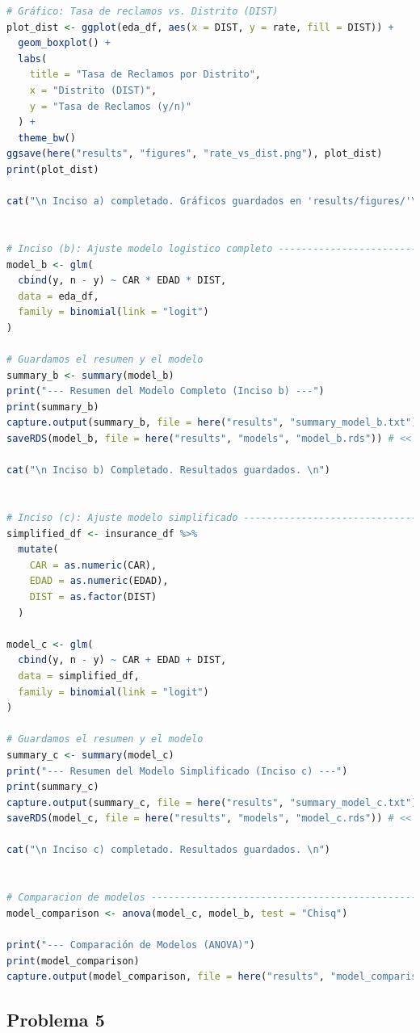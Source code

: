 \begin{lstlisting}[language=R, caption={Script: Reclamo polizas de seguros.}, label={lst:script8}]
# Gráfico: Tasa de reclamos vs. Distrito (DIST)
plot_dist <- ggplot(eda_df, aes(x = DIST, y = rate, fill = DIST)) +
  geom_boxplot() +
  labs(
    title = "Tasa de Reclamos por Distrito",
    x = "Distrito (DIST)",
    y = "Tasa de Reclamos (y/n)"
  ) +
  theme_bw()
ggsave(here("results", "figures", "rate_vs_dist.png"), plot_dist) 
print(plot_dist)

cat("\n Inciso a) completado. Gráficos guardados en 'results/figures/'\n")


# Inciso (b): Ajuste modelo logistico completo --------------------------------
model_b <- glm(
  cbind(y, n - y) ~ CAR * EDAD * DIST,
  data = eda_df,
  family = binomial(link = "logit")
)

# Guardamos el resumen y el modelo
summary_b <- summary(model_b)
print("--- Resumen del Modelo Completo (Inciso b) ---")
print(summary_b)
capture.output(summary_b, file = here("results", "summary_model_b.txt"))
saveRDS(model_b, file = here("results", "models", "model_b.rds")) # << CORREGIDO

cat("\n Inciso b) Completado. Resultados guardados. \n")


# Inciso (c): Ajuste modelo simplificado --------------------------------------
simplified_df <- insurance_df %>%
  mutate(
    CAR = as.numeric(CAR),
    EDAD = as.numeric(EDAD),
    DIST = as.factor(DIST)
  )

model_c <- glm(
  cbind(y, n - y) ~ CAR + EDAD + DIST,
  data = simplified_df,
  family = binomial(link = "logit")
)

# Guardamos el resumen y el modelo
summary_c <- summary(model_c)
print("--- Resumen del Modelo Simplificado (Inciso c) ---")
print(summary_c)
capture.output(summary_c, file = here("results", "summary_model_c.txt"))
saveRDS(model_c, file = here("results", "models", "model_c.rds")) # << CORREGIDO

cat("\n Inciso c) completado. Resultados guardados. \n")


# Comparacion de modelos ------------------------------------------------------
model_comparison <- anova(model_c, model_b, test = "Chisq")

print("--- Comparación de Modelos (ANOVA)")
print(model_comparison)
capture.output(model_comparison, file = here("results", "model_comparison_anova.txt"))

\end{lstlisting}

\clearpage

\subsection{Problema \textcolor{CIMATRed}{5}}

